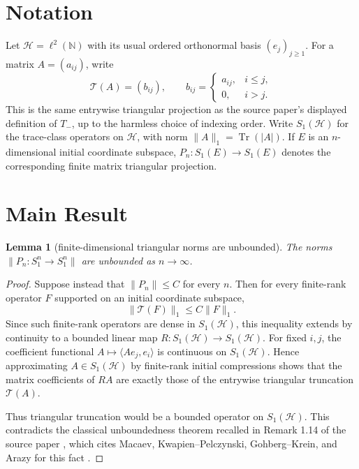 \documentclass[11pt]{amsart}
\newtheorem{lemma}{Lemma}
\newcommand{\Hh}{\mathcal H}
\newcommand{\N}{\mathbb N}
\newcommand{\Tr}{\operatorname{Tr}}
\begin{document}
\section*{Notation}

Let \(\Hh=\ell^2(\N)\) with its usual ordered orthonormal basis
\((e_j)_{j\ge1}\). For a matrix \(A=(a_{ij})\), write
\[
  \mathcal T(A)=(b_{ij}), \qquad
  b_{ij}=
  \begin{cases}
    a_{ij}, & i\le j,\\
    0, & i>j.
  \end{cases}
\]
This is the same entrywise triangular projection as the source paper's
displayed definition of \(T_-\), up to the harmless choice of indexing order.
Write \(S_1(\Hh)\) for the trace-class operators on \(\Hh\), with norm
\(\|A\|_1=\Tr(|A|)\). If \(E\) is an \(n\)-dimensional initial coordinate
subspace, \(P_n:S_1(E)\to S_1(E)\) denotes the corresponding finite matrix
triangular projection.

\section*{Main Result}

\begin{lemma}[finite-dimensional triangular norms are unbounded]
\label{lem:finite-unbounded}
The norms \(\|P_n:S_1^n\to S_1^n\|\) are unbounded as \(n\to\infty\).
\end{lemma}

\begin{proof}
Suppose instead that \(\|P_n\|\le C\) for every \(n\). Then for every
finite-rank operator \(F\) supported on an initial coordinate subspace,
\[
  \|\mathcal T(F)\|_1\le C\|F\|_1.
\]
Since such finite-rank operators are dense in \(S_1(\Hh)\), this inequality
extends by continuity to a bounded linear map \(R:S_1(\Hh)\to S_1(\Hh)\).
For fixed \(i,j\), the coefficient functional
\(A\mapsto \langle A e_j,e_i\rangle\) is continuous on \(S_1(\Hh)\). Hence
approximating \(A\in S_1(\Hh)\) by finite-rank initial compressions shows that
the matrix coefficients of \(R A\) are exactly those of the entrywise
triangular truncation \(\mathcal T(A)\).

Thus triangular truncation would be a bounded operator on \(S_1(\Hh)\). This
contradicts the classical unboundedness theorem recalled in Remark 1.14 of
the source paper \cite{Tumpach2018}, which cites Macaev, Kwapien--Pelczynski,
Gohberg--Krein, and Arazy for this fact
\cite{Macaev1961,KwapienPelczynski1970,GohbergKrein1970,Arazy1978}.
\end{proof}
\end{document}
